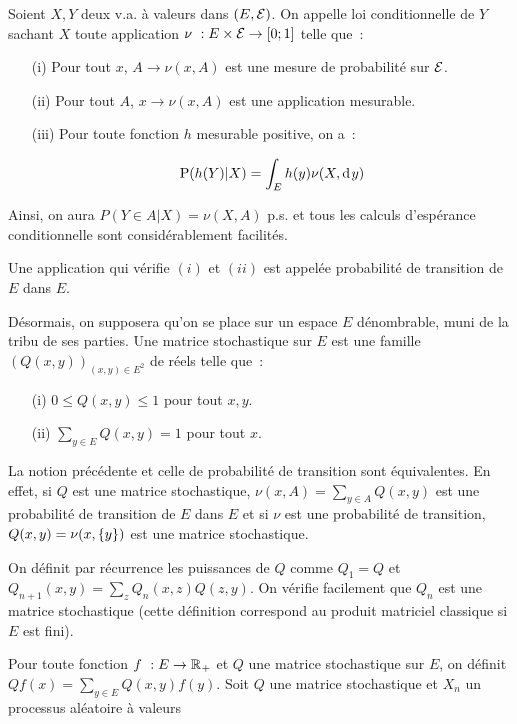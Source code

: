 Soient $X,Y$ deux v.a. à valeurs dans $(E,\mathcal{E})$. On appelle loi conditionnelle de $Y$ sachant 
$X$ toute application $\nu~:E\times\mathcal{E}\to[0;1]$ telle que~:\par
\begin{itemize}
\item[(i)]{} Pour tout $x$, $A\to\nu(x,A)$ est une mesure de probabilité sur $\mathcal{E}$.
\item[(ii)]{} Pour tout $A$, $x\to\nu(x,A)$ est une application mesurable.
\item[(iii)]{} Pour toute fonction $h$ mesurable positive, on a~:\par
$$\textrm{P}(h(Y)|X) = \int_{E} h(y)\nu(X,\mathrm{d}\hspace{1pt}{y})$$
\end{itemize}\par
Ainsi, on aura $P(Y\in A|X) = \nu(X,A)$ p.s. et tous les calculs d'espérance conditionnelle sont 
considérablement facilités.\par
\rmq Une application qui vérifie $(i)$ et $(ii)$ est appelée probabilité de transition de $E$ dans $E$.\par
Désormais, on supposera qu'on se place sur un espace $E$ dénombrable, muni de la tribu de ses parties.
Une matrice stochastique sur $E$ est une famille $(Q(x,y))_{(x,y)\in E^2}$ de réels telle que~:
\begin{itemize}
\item[(i)]{} $0\leq Q(x,y)\leq 1$ pour tout $x,y$.
\item[(ii)]{} $\sum\limits_{y\in E} Q(x,y) = 1$ pour tout $x$.
\end{itemize}
La notion précédente et celle de probabilité de transition sont équivalentes. En effet, si $Q$ est une 
matrice stochastique, $\nu(x,A)=\sum_{y\in A}Q(x,y)$ est une probabilité de transition de $E$ dans $E$
et si $\nu$ est une probabilité de transition, $Q(x,y) = \nu(x,\{y\})$ est une matrice stochastique.\par
On définit par récurrence les puissances de $Q$ comme $Q_1 = Q$ et $Q_{n+1}(x,y)=\sum_z Q_n(x,z)Q(z,y)$. On
vérifie facilement que $Q_n$ est une matrice stochastique (cette définition correspond au produit
matriciel classique si $E$ est fini).\par
Pour toute fonction $f~:E\to {\mathbb{R}^{}}_+$ et $Q$ une matrice stochastique sur $E$,
on définit $Qf(x) = \sum\limits_{y\in E}Q(x,y)f(y)$.
 Soit $Q$ une matrice stochastique et $X_n$ un processus aléatoire à valeurs
